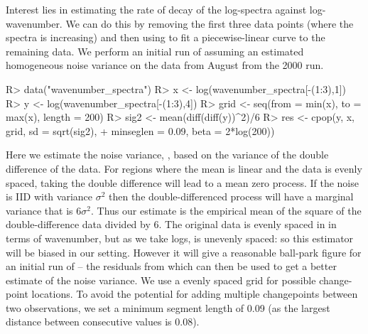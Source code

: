 \documentclass[article]{jss}
\begin{document}
Interest lies in estimating the rate of decay of the log-spectra against log-wavenumber. We can do this by removing the first three data points (where the spectra is increasing) and then using  to fit a piecewise-linear curve to the remaining data. We perform an initial run of  assuming an estimated homogeneous noise variance on the data from August from the 2000 run.
\begin{CodeChunk}
\begin{CodeInput}
R> data("wavenumber_spectra")
R> x <- log(wavenumber_spectra[-(1:3),1])
R> y <- log(wavenumber_spectra[-(1:3),4])
R> grid <- seq(from = min(x), to = max(x), length = 200)
R> sig2 <- mean(diff(diff(y))^2)/6 
R> res <- cpop(y, x, grid, sd = sqrt(sig2), 
+              minseglen = 0.09, beta = 2*log(200))
\end{CodeInput}
\end{CodeChunk}
Here we estimate the noise variance, , based on the variance of the double difference of the data. For regions where the mean is linear and the data is evenly spaced, taking the double difference will lead to a mean zero process. If the noise is IID with variance $\sigma^2$ then the double-differenced process will have a marginal variance that is $6\sigma^2$. Thus our estimate is the empirical mean of the square of the double-difference data divided by 6. The original data is evenly spaced in in terms of wavenumber, but as we take logs,  is unevenly spaced: so this estimator will be biased in our setting. However it will give a reasonable ball-park figure for an initial run of  -- the residuals from which can then be used to get a better estimate of the noise variance. We use a evenly spaced grid for possible change-point locations. To avoid the potential for adding multiple changepoints between two observations, we set a minimum segment length of 0.09 (as the largest distance between consecutive  values is 0.08).
\end{document}
